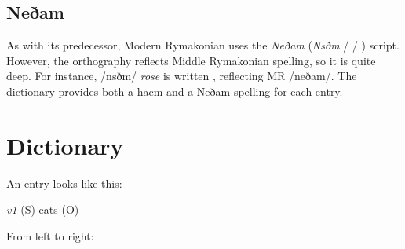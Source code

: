 \documentclass{book}
\newcommand{\lname}{Modern Rymakonian}
\begin{document}
\section{Neðam}

As with its predecessor, \lname{} uses the \emph{Neðam} (\emph{Nsðm} /  / ) script. However, the orthography reflects Middle Rymakonian spelling, so it is quite deep. For instance,  /nsðm/ \emph{rose} is written , reflecting MR  /neðam/. The dictionary provides both a hacm and a Neðam spelling for each entry.

\chapter{Dictionary}

An entry looks like this:

 \textit{v1}
\quad (S) eats (O)

From left to right:
\end{document}
